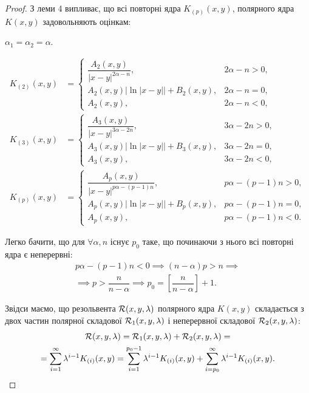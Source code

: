 \begin{proof}
	З леми 4 випливає, що всі повторні ядра $K_{(p)}(x, y)$, полярного ядра $K(x, y)$ задовольняють оцінкам: \medskip

	$\alpha_1 = \alpha_2 = \alpha$.

	\begin{equation}
		\begin{aligned}
			K_{(2)}(x, y) &= \begin{cases}
				\dfrac{A_2(x, y)}{|x - y|^{2\alpha - n}}, & 2\alpha - n > 0, \\
				A_2(x, y) |\ln|x - y|| + B_2(x, y), & 2\alpha - n = 0, \\
				A_2(x, y), & 2\alpha - n < 0,
			\end{cases} \\
			K_{(3)}(x, y) &= \begin{cases}
				\dfrac{A_3(x, y)}{|x - y|^{3\alpha - 2n}}, & 3\alpha - 2n > 0, \\
				A_3(x, y) |\ln|x - y|| + B_3(x, y), & 3\alpha - 2n = 0, \\
				A_3(x, y), & 3\alpha - 2n < 0,
			\end{cases} \\
			K_{(p)}(x, y) &= \begin{cases}
				\dfrac{A_p(x, y)}{|x - y|^{p\alpha - (p-1)n}}, & p\alpha - (p - 1)n > 0, \\
				A_p(x, y) |\ln|x - y|| + B_p(x, y), & p\alpha - (p - 1)n = 0, \\
				A_p(x, y), & p\alpha - (p - 1)n < 0.
			\end{cases}
		\end{aligned}
	\end{equation}

	Легко бачити, що для $\forall \alpha, n$ існує $p_0$ таке, що починаючи з нього всі повторні ядра є неперервні:
	\begin{multline}
		p \alpha - (p - 1) n < 0 \implies (n - \alpha) p > n \implies \\
		\implies p > \dfrac{n}{n - \alpha} \implies p_0 = \left[ \dfrac{n}{n - \alpha} \right] + 1.
	\end{multline}

	Звідси маємо, що резольвента $\cal{R}(x, y, \lambda)$ полярного ядра $K(x, y)$ складається з двох частин полярної складової $\cal{R}_1(x, y, \lambda)$ і неперервної складової $\cal{R}_2(x, y, \lambda)$:
	\begin{multline}
		\cal{R}(x, y, \lambda) = \cal{R}_1(x, y, \lambda) + \cal{R}_2(x, y, \lambda) = \\
		= \Sum_{i = 1}^\infty \lambda^{i - 1} K_{(i)}(x, y) = \Sum_{i = 1}^{p_0 - 1} \lambda^{i - 1} K_{(i)}(x, y) + \Sum_{i = p_0}^\infty \lambda^{i - 1} K_{(i)}(x, y).
	\end{multline}


\end{proof}
